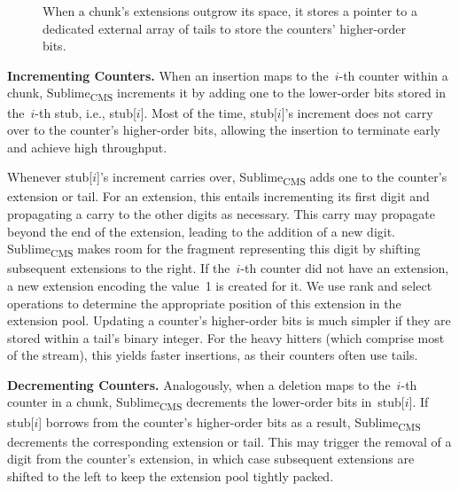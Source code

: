 \documentclass[sigconf]{acmart}
\newcommand{\sketch}{Sublime}
\newcommand{\sketchcms}{\sketch\textsubscript{CMS}\xspace}
\begin{document}
\begin{figure}
    \caption{When a chunk's extensions outgrow its space, it stores a pointer
    to a dedicated external array of tails to store the counters' higher-order
    bits.}
    \label{fig:counter_chunk_with_tails}
\end{figure}

\textbf{Incrementing Counters.}
When an insertion maps to the~$i${\nobreakdash-}th counter within a chunk,
\sketchcms increments it by adding one to the lower-order bits stored in
the~$i${\nobreakdash-}th stub, i.e., stub[$i$]. Most of the time, stub[$i$]'s
increment does not carry over to the counter's higher-order bits, allowing the
insertion to terminate early and achieve high throughput.

Whenever stub[$i$]'s increment carries over, \sketchcms adds one to the
counter's extension or tail. For an extension, this entails incrementing its
first digit and propagating a carry to the other digits as necessary. This
carry may propagate beyond the end of the extension, leading to the addition of
a new digit. \sketchcms makes room for the fragment representing this digit by
shifting subsequent extensions to the right. If the~$i${\nobreakdash-}th
counter did not have an extension, a new extension encoding the value~1 is
created for it. We use rank and select operations to determine the appropriate
position of this extension in the extension pool. Updating a counter's
higher-order bits is much simpler if they are stored within a tail's binary
integer. For the heavy hitters (which comprise most of the stream), this yields
faster insertions, as their counters often use tails.

\textbf{Decrementing Counters.}
Analogously, when a deletion maps to the~$i${\nobreakdash-}th counter in a chunk, \sketchcms decrements the lower-order bits in~stub[$i$].
If stub[$i$] borrows from the counter's higher-order bits as a result, \sketchcms decrements the corresponding extension or tail.
This may trigger the removal of a digit from the counter's extension, in which case subsequent extensions are shifted to the left to keep the extension pool tightly packed. 
\end{document}
